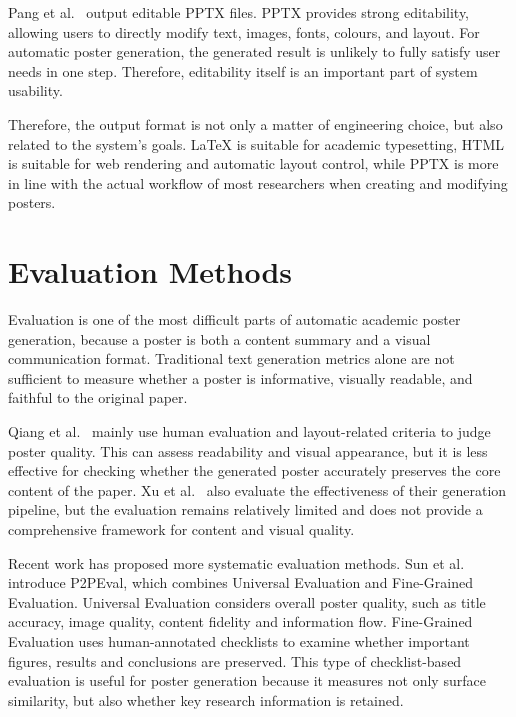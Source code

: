 \documentclass[12pt,oneside]{report}
\begin{document}
\vspace{1em}

Pang et al.~\cite{paper2poster} output editable PPTX files. PPTX provides strong editability, allowing users to directly modify text, images, fonts, colours, and layout. For automatic poster generation, the generated result is unlikely to fully satisfy user needs in one step. Therefore, editability itself is an important part of system usability.

\vspace{1em}

Therefore, the output format is not only a matter of engineering choice, but also related to the system's goals. LaTeX is suitable for academic typesetting, HTML is suitable for web rendering and automatic layout control, while PPTX is more in line with the actual workflow of most researchers when creating and modifying posters.

\section{Evaluation Methods}

Evaluation is one of the most difficult parts of automatic academic poster generation, because a poster is both a content summary and a visual communication format. Traditional text generation metrics alone are not sufficient to measure whether a poster is informative, visually readable, and faithful to the original paper.

\vspace{1em}

Qiang et al.~\cite{poster2016} mainly use human evaluation and layout-related criteria to judge poster quality. This can assess readability and visual appearance, but it is less effective for checking whether the generated poster accurately preserves the core content of the paper. Xu et al.~\cite{posterbot} also evaluate the effectiveness of their generation pipeline, but the evaluation remains relatively limited and does not provide a comprehensive framework for content and visual quality.

\vspace{1em}

Recent work has proposed more systematic evaluation methods. Sun et al.~\cite{p2p} introduce P2PEval, which combines Universal Evaluation and Fine-Grained Evaluation. Universal Evaluation considers overall poster quality, such as title accuracy, image quality, content fidelity and information flow. Fine-Grained Evaluation uses human-annotated checklists to examine whether important figures, results and conclusions are preserved. This type of checklist-based evaluation is useful for poster generation because it measures not only surface similarity, but also whether key research information is retained.
\end{document}
